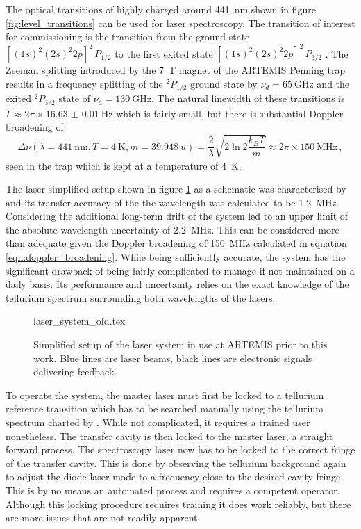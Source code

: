 The optical transitions of highly charged  around \qty{441}{\nm} shown in figure \ref{fig:level_transitions} can be used for laser spectroscopy. The transition of interest for commissioning is the transition from the ground state $[(1s)^2 (2s)^2 2p]^2 \, P_{1/2}$ to the first exited state $[(1s)^2 (2s)^2 2p]^2 \, P_{3/2}$ \cite{optical_transitions_ar13}. The Zeeman splitting introduced by the \qty{7}{\tesla} magnet of the ARTEMIS Penning trap results in a frequency splitting of the $^2P_{1/2}$ ground state by $\nu_d = \qty{65}{\GHz}$ and the exited $^2 P_{3/2}$ state of $\nu_a = \qty{130}{\GHz}$. The natural linewidth of these transitions is $\Gamma \approx 2 \pi \times \qty{16.63(1)}{\Hz}$ which is fairly small, but there is substantial Doppler broadening of
\begin{equation}
    \Delta \nu (\lambda = \qty{441}{\nm}, T=\qty{4}{\K}, m=\qty{39.948}{u}) = \frac{2}{\lambda}\sqrt{2 \ln 2 \frac{k_B T}{m}} \approx 2 \pi \times \qty{150}{\MHz} \, , \label{eqn:doppler_broadening}
\end{equation}
seen in the trap which is kept at a temperature of \qty{4}{\K}.

The laser simplified setup shown in figure \ref{fig:laser_system_old} as a schematic was characterised by \citeauthor{thesis_alex} \cite{thesis_alex} and its transfer accuracy of the the wavelength was calculated to be \qty{1.2}{\MHz}. Considering the additional long-term drift of the system led to an upper limit of the absolute wavelength uncertainty of \qty{2.2}{\MHz}. This can be considered more than adequate given the Doppler broadening of \qty{150}{\MHz} calculated in equation \ref{eqn:doppler_broadening}. While being sufficiently accurate, the system has the significant drawback of being fairly complicated to manage if not maintained on a daily basis. Its performance and uncertainty relies on the exact knowledge of the tellurium spectrum surrounding both wavelengths of the lasers.
\begin{figure}[ht]
    \centering
        {laser_system_old.tex}
    \caption{Simplified setup of the laser system in use at ARTEMIS prior to this work. Blue lines are laser beams, black lines are electronic signals delivering feedback.}
    \label{fig:laser_system_old}
\end{figure}

To operate the system, the master laser must first be locked to a tellurium reference transition which has to be searched manually using the tellurium spectrum charted by \cite{thesis_alex}. While not complicated, it requires a trained user nonetheless. The transfer cavity is then locked to the master laser, a straight forward process. The spectroscopy laser now has to be locked to the correct fringe of the transfer cavity. This is done by observing the tellurium background again to adjust the diode laser mode to a frequency close to the desired cavity fringe. This is by no means an automated process and requires a competent operator. Although this locking procedure requires training it does work reliably, but there are more issues that are not readily apparent.

